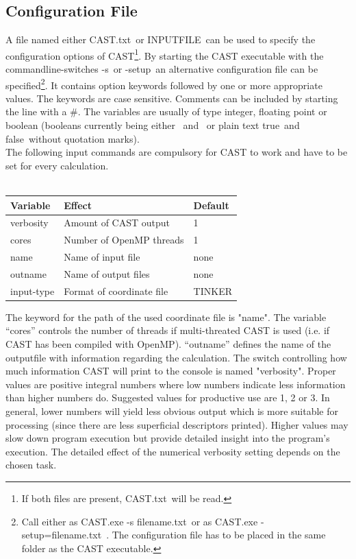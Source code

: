 \documentclass[10pt,a4paper]{article} %
\begin{document}
	\subsection{Configuration File}
	A file named either \glqq CAST.txt\grqq~or \glqq INPUTFILE\grqq~can be used to specify the configuration options of \ac{CAST}\footnote{If both files are present, \glqq CAST.txt\grqq~will be read.}. By starting the CAST executable with the commandline-switches \glqq -s\grqq~or \glqq -setup\grqq~an alternative configuration file can be specified\footnote{Call either as \glqq CAST.exe -s filename.txt\grqq~or as \glqq CAST.exe -setup=filename.txt\grqq~. The configuration file has to be placed in the same folder as the CAST executable.}. It contains option keywords followed by one or more appropriate values. The keywords are case sensitive. Comments can be included by starting the line with a \glqq \#\grqq. The variables are usually of type integer, floating point or boolean (booleans currently being either \grqq~and \grqq~or plain text \glqq true\grqq~and \glqq false\grqq~without quotation marks).\\

	The following input commands are compulsory for \ac{CAST} to work and have to be set for every calculation.\\~\\
	\begin{minipage}{\textwidth}
	\begin{longtable}{|p{3cm}|p{5cm}|p{3cm}|}
		Variable&	Effect &	Default \\
		\hline
		verbosity &	Amount of \ac{CAST} output &	1\\
		cores &	Number of OpenMP threads &	1\\
		name &	Name of input file &	none\\
		outname &	Name of output files &	none\\
		input-type &	Format of coordinate file &	TINKER\\
	\end{longtable}
	\end{minipage}
	
	The keyword for the path of the used coordinate file is "name". The variable ``cores'' controls the number of threads if multi-threated \ac{CAST} is used (i.e. if \ac{CAST} has been compiled with OpenMP\supercite{openmp08}). ``outname'' defines the name of the outputfile with information regarding the calculation.
	The switch controlling how much information \ac{CAST} will print to the console is named "verbosity". Proper values are positive integral numbers where low numbers indicate less information than higher numbers do. Suggested values for productive use are 1, 2 or 3. In general, lower numbers will yield less obvious output which is  more suitable for processing (since there are less superficial descriptors printed). Higher values may slow down program execution but provide detailed insight into the program's execution. The detailed effect of the numerical verbosity setting depends on the chosen task.
\end{document}
